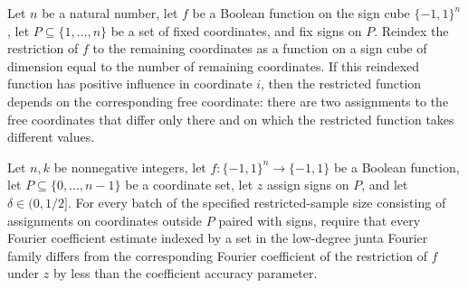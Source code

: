 \begin{theorem}
\label{FABL.isRelevantJuntaRestriction_of_reindexed}
\leanok
{}
Let $n$ be a natural number, let $f$ be a Boolean function on the sign cube
$\{−1,1\}^n$, let $P\subseteq\{1,\ldots,n\}$ be a set of fixed coordinates, and
fix signs on $P$. Reindex the restriction of $f$ to the remaining coordinates as a
function on a sign cube of dimension equal to the number of remaining coordinates. If
this reindexed function has positive influence in coordinate $i$, then the restricted
function depends on the corresponding free coordinate: there are two assignments to the
free coordinates that differ only there and on which the restricted function takes
different values.
\end{theorem}

\begin{definition}
\label{FABL.LowDegreeJuntaFourierEstimatesAccurate}
\leanok
{}
Let $n,k$ be nonnegative integers, let $f:\{−1,1\}^n\to\{−1,1\}$ be a Boolean function,
let $P\subseteq\{0,\ldots,n-1\}$ be a coordinate set, let $z$ assign signs on $P$, and
let $\delta\in(0,1/2]$. For every batch of the specified restricted-sample size
consisting of assignments on coordinates outside $P$ paired with signs, require that
every Fourier coefficient estimate indexed by a set in the low-degree junta Fourier
family differs from the corresponding Fourier coefficient of the restriction of $f$
under $z$ by less than the coefficient accuracy parameter.
\end{definition}


